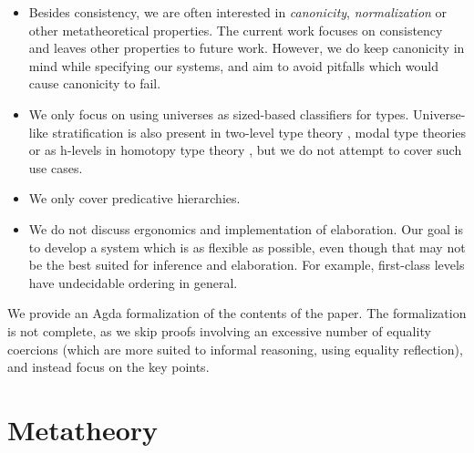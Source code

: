 \documentclass[a4paper,UKenglish,cleveref, autoref, thm-restate]{lipics-v2021}
\theoremstyle{remark}
\theoremstyle{definition}
\begin{document}
\begin{itemize}

\item
Besides consistency, we are often interested in \emph{canonicity},
\emph{normalization} or other metatheoretical properties. The current work
focuses on consistency and leaves other properties to future work. However, we
do keep canonicity in mind while specifying our systems, and aim to avoid
pitfalls which would cause canonicity to fail.
\item
We only focus on using universes as sized-based classifiers for
types. Universe-like stratification is also present in two-level type theory
\cite{twolevel}, modal type theories \cite{gratzer20multimodal} or as h-levels
in homotopy type theory \cite{hottbook}, but we do not attempt to cover such use
cases.
\item
We only cover predicative hierarchies.
\item
We do not discuss ergonomics and implementation of elaboration. Our goal is to
develop a system which is as flexible as possible, even though that may not be
the best suited for inference and elaboration. For example, first-class levels
have undecidable ordering in general.
\end{itemize}

We provide an Agda formalization of the contents of the paper. The formalization
is not complete, as we skip proofs involving an excessive number of equality
coercions (which are more suited to informal reasoning, using equality
reflection), and instead focus on the key points.

\section{Metatheory}
\label{sec:metatheory}

\end{document}
